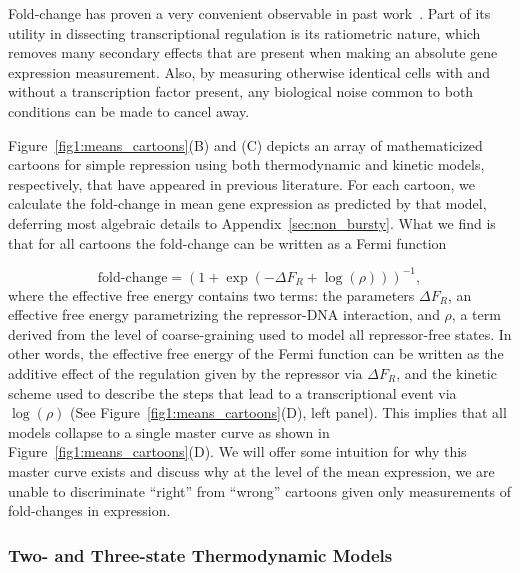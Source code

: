 Fold-change has proven a very convenient observable in past
work~\cite{Garcia2011a, Brewster2014, Razo-Mejia2018, Chure2019}. Part of its
utility in dissecting transcriptional regulation is its ratiometric nature,
which removes many secondary effects that are present when making an absolute
gene expression measurement. Also, by measuring otherwise identical cells with
and without a transcription factor present, any biological noise common to both
conditions can be made to cancel away.

Figure~\ref{fig1:means_cartoons}(B) and (C) depicts an array of mathematicized
cartoons for simple repression using both thermodynamic and kinetic models,
respectively, that have appeared in previous literature. For each cartoon, we
calculate the fold-change in mean gene expression as predicted by that model,
deferring most algebraic details to Appendix~\ref{sec:non_bursty}. What we find
is that for all cartoons the fold-change can be written as a Fermi function

\begin{equation}
 \text{fold-change} = \left( 1 + \exp(-\Delta F_R + \log(\rho))  \right)^{-1},
 \label{eq:deltaFR_eq_noneq_equiv}
\end{equation}
where the effective free energy contains two terms: the parameters $\Delta F_R$,
an effective free energy parametrizing the repressor-DNA interaction, and
$\rho$, a term derived from the level of coarse-graining used to model all
repressor-free states. In other words, the effective free energy of the Fermi
function can be written as the additive effect of the regulation given by the
repressor via $\Delta F_R$, and the kinetic scheme used to describe the steps
that lead to a transcriptional event via $\log(\rho)$ (See
Figure~\ref{fig1:means_cartoons}(D), left panel). This implies that all models
collapse to a single master curve as shown in
Figure~\ref{fig1:means_cartoons}(D). We will offer some intuition for why this
master curve exists and discuss why at the level of the mean expression, we are
unable to discriminate ``right'' from ``wrong'' cartoons given only measurements
of fold-changes in expression.

\subsubsection{Two- and Three-state Thermodynamic Models}

